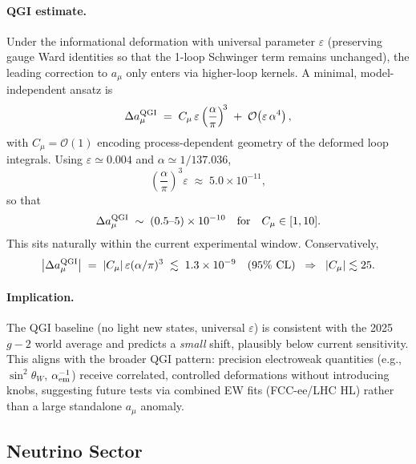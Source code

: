 \documentclass{article}
\numberwithin{equation}{section}
\theoremstyle{plain}
\theoremstyle{definition}
\theoremstyle{remark}
\begin{document}
\paragraph{QGI estimate.}
Under the informational deformation with universal parameter $\varepsilon$ (preserving gauge Ward identities so that the 1-loop Schwinger term remains unchanged), the leading correction to $a_\mu$ only enters via higher-loop kernels. A minimal, model-independent ansatz is
\begin{equation}
  \Delta a_\mu^{\rm QGI} \;=\; C_\mu \,\varepsilon \left(\frac{\alpha}{\pi}\right)^{\!3}
  \;+\; \mathcal{O}\!\left(\varepsilon\,\alpha^{4}\right),
  \label{eq:qgi-gminus2}
\end{equation}
with $C_\mu=\mathcal{O}(1)$ encoding process-dependent geometry of the deformed loop integrals.
Using $\varepsilon\simeq 0.004$ and $\alpha\simeq 1/137.036$,
\begin{equation}
  \left(\frac{\alpha}{\pi}\right)^{\!3}\varepsilon \;\approx\; 5.0\times10^{-11},
\end{equation}
so that
\begin{equation}
  \Delta a_\mu^{\rm QGI} \;\sim\; (0.5\text{--}5)\times10^{-10}
  \quad \text{for}\quad C_\mu\in[1,10].
\end{equation}
This sits naturally within the current experimental window. Conservatively,
\begin{equation}
  \bigl|\Delta a_\mu^{\rm QGI}\bigr|
  \;=\; |C_\mu|\,\varepsilon(\alpha/\pi)^3
  \;\lesssim\; 1.3\times10^{-9}\quad(95\%~\text{CL})
  \;\;\Rightarrow\;\; |C_\mu|\lesssim 25.
\end{equation}

\paragraph{Implication.}
The QGI baseline (no light new states, universal $\varepsilon$) is consistent with the 2025 $g\!-\!2$ world average and predicts a \emph{small} shift, plausibly below current sensitivity. This aligns with the broader QGI pattern: precision electroweak quantities (e.g., $\sin^2\theta_W$, $\alpha^{-1}_{\rm em}$) receive correlated, controlled deformations without introducing knobs, suggesting future tests via combined EW fits (FCC-ee/LHC HL) rather than a large standalone $a_\mu$ anomaly.

\subsection{Neutrino Sector}
\end{document}
